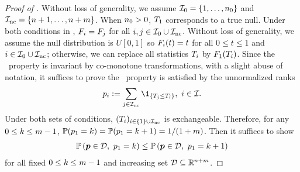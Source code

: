 \begin{proof}[Proof of ]

Without loss of generality, we assume ${\mathcal{I}_{0}} = \{1,
\dotsc, {n_0}\}$ and ${\mathcal{I}_{\text{nc}}} = \{{n}+1, \dotsc,
{n}+m\}$.
When ${n_0} > 0$, ${T_{1}}$ corresponds to a true null.
Under both conditions in , ${F_{i}} =
{F_{j}}$ for all $i,j \in  {\mathcal{I}_{0}} \cup
{\mathcal{I}_{\text{nc}}}$. Without loss of generality, we assume
the null distribution is $U[0,1]$ so ${F_{i}}(t) = t$
for all $0 \leq t \leq 1$ and $i \in  {\mathcal{I}_{0}} \cup
{\mathcal{I}_{\text{nc}}}$; otherwise, we can replace all statistics
${T_{i}}$ by ${F_{1}}({T_{i}})$.
Since the \PRDS~property is invariant by co-monotone transformations,
with a slight abuse of notation, it suffices to prove the
\PRDS~property is satisfied by the unnormalized ranks
\begin{align*}
    \qval{i} := \sum_{j \in \hypothesisIndex{\text{nc}}}
  \1_{\{\testStatistics{j} \le \testStatistics{i}\}},~i \in \hypothesisIndex{}.
\end{align*}
Under both sets of conditions, $({T_{i}})_{i \in \{1\} \cup {\mathcal{I}_{\text{nc}}}}$ is exchangeable.
Therefore, for any $0 \le k \le m - 1$, $\mathbb{P}({p_{1}} = k) =
\mathbb{P}({p_{1}} = k+1) = 1/(1+m)$. Then
it suffices to show
\begin{align*}
    \mathbb{P}\left({\boldsymbol{p}} \in \mathcal{D}, ~{p_{1}} = k\right) \le \mathbb{P}\left({\boldsymbol{p}} \in \mathcal{D}, ~{p_{1}} = k+1\right)
\end{align*}
for all fixed $0 \le k \le m - 1$ and increasing set $\mathcal{D}
\subseteq \mathbb{R}^{{n}+m}$.


\end{proof}
